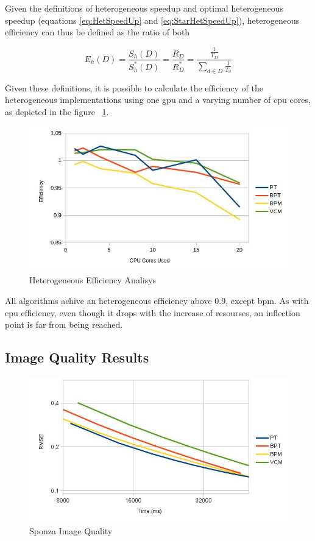 Given the definitions of heterogeneous speedup and optimal heterogeneous speedup (equations \ref{eq:HetSpeedUp} and \ref{eq:StarHetSpeedUp}), heterogeneous efficiency can thus be defined as the ratio of both

\begin{equation}
E_h(D) = \frac{S_h(D)}{S_h^*(D)} = \frac{R_D}{R^*_D} = \frac{\frac{1}{T_D}}{\sum_{d \in D} \frac{1}{T_d}}
\label{eq:HetEff}
\end{equation}

Given these definitions, it is possible to calculate the efficiency of the heterogeneous implementations using one \gls{gpu} and a varying number of \gls{cpu} cores, as depicted in the figure ~\ref{img:hefficiency}.

\begin{figure}[H]
\centering
\includegraphics[width=0.8\linewidth]{img/hefficiency.jpg}
\caption{\label{img:hefficiency} Heterogeneous Efficiency Analisys}
\end{figure}

All algorithms achive an heterogeneous efficiency above 0.9, except \gls{bpm}. As with \gls{cpu} efficiency, even though it drops with the increase of resourses, an inflection point is far from being reached.

\subsection{Image Quality Results}

\begin{figure}[H]
\centering
\includegraphics[width=0.8\linewidth]{img/sponzaImgq.jpg}
\caption{\label{img:sponzaImgq} Sponza Image Quality}
\end{figure}

